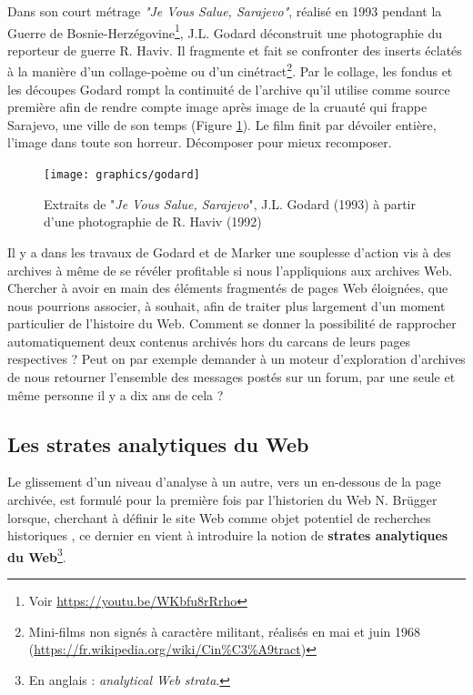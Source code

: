 \documentclass[symmetric,justified,marginals=raggedouter]{tufte-book}
\begin{document}
Dans son court métrage \textit{"Je Vous Salue, Sarajevo"}, réalisé en 1993 pendant la Guerre de Bosnie-Herzégovine\footnote{Voir \url{https://youtu.be/WKbfu8rRrho}}, J.L. Godard déconstruit une photographie du reporteur de guerre R. Haviv. Il fragmente et fait se confronter des inserts éclatés à la manière d'un collage-poème ou d'un cinétract\footnote{Mini-films non signés à caractère militant, réalisés en mai et juin 1968 (\url{https://fr.wikipedia.org/wiki/Cin\%C3\%A9tract})}. Par le collage, les fondus et les découpes Godard rompt la continuité de l'archive qu'il utilise comme source première afin de rendre compte image après image de la cruauté qui frappe Sarajevo, une ville de son temps (Figure \ref{fig:godard}). Le film finit par dévoiler entière, l'image dans toute son horreur. Décomposer pour mieux recomposer.

\begin{figure}
  \texttt{[image: graphics/godard]}
  \caption{Extraits de "\textit{Je Vous Salue, Sarajevo}", J.L. Godard (1993) à partir d'une photographie de R. Haviv (1992)}
  \label{fig:godard}
\end{figure}

Il y a dans les travaux de Godard et de Marker une souplesse d'action vis à des archives à même de se révéler profitable si nous l'appliquions aux archives Web. Chercher à avoir en main des éléments fragmentés de pages Web éloignées, que nous pourrions associer, à souhait, afin de traiter plus largement d'un moment particulier de l'histoire du Web. Comment se donner la possibilité de rapprocher automatiquement deux contenus archivés hors du carcans de leurs pages respectives ? Peut on par exemple demander à un moteur d'exploration d'archives de nous retourner l'ensemble des messages postés sur un forum, par une seule et même personne il y a dix ans de cela ?  

\subsection{Les strates analytiques du Web}

\par\noindent Le glissement d'un niveau d'analyse à un autre, vers un en-dessous de la page archivée, est formulé pour la première fois par l'historien du Web N. Brügger lorsque, cherchant à définir le site Web comme objet potentiel de recherches historiques \citep{brugger_website_2009}, ce dernier en vient à introduire la notion de \textbf{strates analytiques du Web}\footnote{En anglais : \textit{analytical Web strata}.}.
\end{document}
